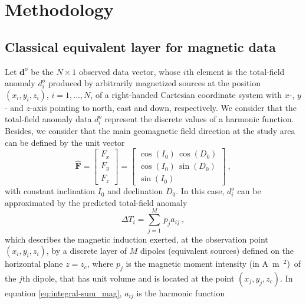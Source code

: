 \section{Methodology}

\subsection{Classical equivalent layer for magnetic data}

Let $\mathbf{d}^{o}$ be the $N \times 1$ observed data vector, whose $i$th element 
is the total-field anomaly $d^{o}_{i}$ produced by arbitrarily magnetized sources
at the position $(x_{i}, y_{i}, z_{i})$, $i =  1, \dots, N $, 
of a right-handed Cartesian coordinate system with $x$-, $y$- and $z$-axis 
pointing to north, east and down, respectively.
We consider that the total-field anomaly data $d^{o}_{i}$ represent the discrete
values of a harmonic function. Besides, we consider that the main geomagnetic field 
direction at the study area can be defined by the unit vector
\begin{equation}
\hat{\mathbf{F}} = \begin{bmatrix}
F_x \\
F_y \\
F_z
\end{bmatrix} =
\begin{bmatrix}
\cos(I_{0}) \, \cos(D_{0}) \\
\cos(I_{0}) \, \sin(D_{0}) \\
\sin(I_{0})
\end{bmatrix} \: ,
\label{eq:unit_vector_F}
\end{equation}
with constant inclination $I_{0}$ and declination $D_{0}$.
In this case, $d^{o}_{i}$ can be approximated by the predicted total-field anomaly
\begin{equation}
\Delta T_{i} = \sum_{j=1}^{M} \, p_{j} a_{ij} \: ,
\label{eq:integral-sum_mag}
\end{equation}
which describes the magnetic induction exerted, at the observation point $(x_{i}, y_{i}, z_{i})$,
by a discrete layer of $M$ dipoles (equivalent sources) defined on the horizontal plane $z = z_{c}$, 
where $p_{j}$ is the magnetic moment intensity (in A~m~$^{2}$)~of the $j$th dipole, 
that has unit volume and is located at the point $(x_{j}, y_{j}, z_{c})$. In equation
\ref{eq:integral-sum_mag}, $a_{ij}$ is the harmonic function
